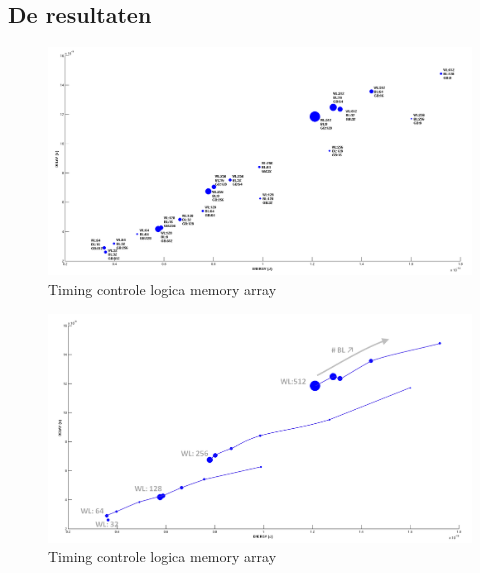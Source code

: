 \subsection{De resultaten}

\begin{figure}[h!]
  \centering
  \includegraphics[scale=0.35]{../fig/hfdstk-timing-all-sol1.png}
  \caption{Timing controle logica memory array}
  \label{fig:leescyclus}
\end{figure} 

\begin{figure}[h!]
  \centering
  \includegraphics[scale=0.6]{../fig/hfdstk-timing-all-sol2.png}
  \caption{Timing controle logica memory array}
  \label{fig:leescyclus}
\end{figure} 
